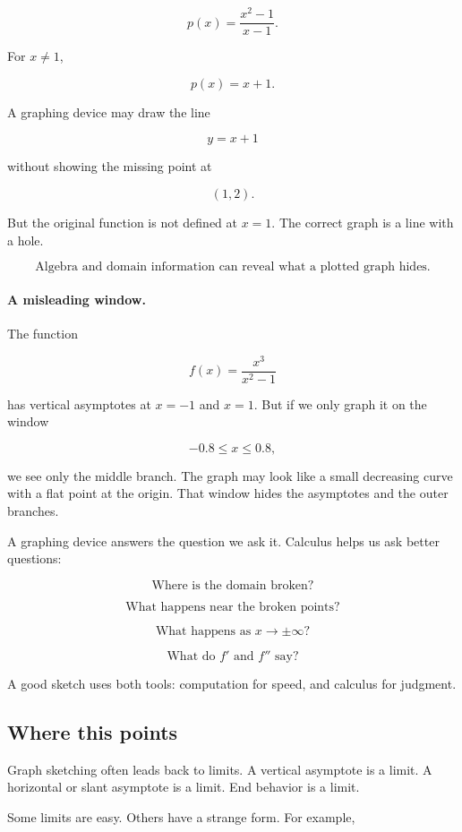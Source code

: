 \[
p(x)=\frac{x^2-1}{x-1}.
\]

For \(x\neq1\),

\[
p(x)=x+1.
\]

A graphing device may draw the line

\[
y=x+1
\]

without showing the missing point at

\[
(1,2).
\]

But the original function is not defined at \(x=1\).  The correct graph is a line with a
hole.

\[
\boxed{
\text{Algebra and domain information can reveal what a plotted graph hides.}
}
\]

\paragraph{A misleading window.}
The function

\[
f(x)=\frac{x^3}{x^2-1}
\]

has vertical asymptotes at \(x=-1\) and \(x=1\).  But if we only graph it on the
window

\[
-0.8\le x\le0.8,
\]

we see only the middle branch.  The graph may look like a small decreasing curve
with a flat point at the origin.  That window hides the asymptotes and the outer
branches.

A graphing device answers the question we ask it.  Calculus helps us ask better
questions:

\[
\text{Where is the domain broken?}
\]

\[
\text{What happens near the broken points?}
\]

\[
\text{What happens as }x\to\pm\infty?
\]

\[
\text{What do }f'\text{ and }f''\text{ say?}
\]

A good sketch uses both tools: computation for speed, and calculus for judgment.

\subsection{Where this points}
\label{subsec:graph-sketching-hook-lhospital}

Graph sketching often leads back to limits.  A vertical asymptote is a limit.  A
horizontal or slant asymptote is a limit.  End behavior is a limit.

Some limits are easy.  Others have a strange form.  For example,

